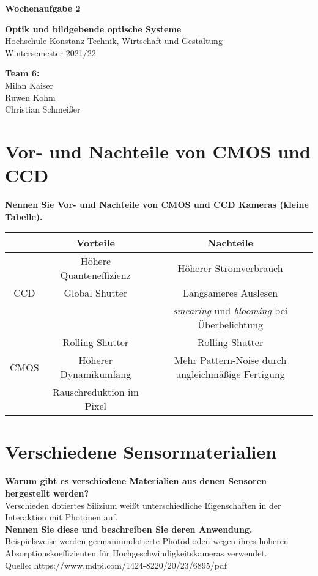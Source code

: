 \documentclass[a4paper]{article}
\begin{document}
	\thispagestyle{empty}
	
	\begin{center}\strut
		\bfseries\Huge
		Wochenaufgabe 2
	\end{center}
	\vfill
	
	\begin{center}\strut
		\textbf{Optik und bildgebende optische Systeme}\\
		Hochschule Konstanz Technik, Wirtschaft und Gestaltung\\
		Wintersemester 2021/22
	\end{center}
	
	\begin{center}\strut
		\textbf{Team 6:}\\
		Milan Kaiser\\
		Ruwen Kohm\\
		Christian Schmeißer\\
	\end{center}
	\vfill
	\vfill

	\clearpage
	
	\section{Vor- und Nachteile von CMOS und CCD}
	\textbf{Nennen Sie Vor- und Nachteile von CMOS und CCD Kameras (kleine Tabelle).}
	\begin{center}
		\begin{tabular}{ c|c|c }
			       & Vorteile & Nachteile \\ 
			       \hline
			       & Höhere Quanteneffizienz &  Höherer Stromverbrauch\\
			CCD	   & Global Shutter &  Langsameres Auslesen\\
				   & & \textit{smearing} und \textit{blooming} bei Überbelichtung\\
				   \hline  
			       & Rolling Shutter & Rolling Shutter \\ 
			CMOS   & Höherer Dynamikumfang & Mehr Pattern-Noise durch ungleichmäßige Fertigung \\
			       & Rauschreduktion im Pixel & \\
		\end{tabular}
	\end{center}
	
	\section{Verschiedene Sensormaterialien}
	\textbf{Warum gibt es verschiedene Materialien aus denen Sensoren hergestellt werden?}\\
	Verschieden dotiertes Silizium weißt unterschiedliche Eigenschaften in der Interaktion mit Photonen auf.\\
	\textbf{Nennen Sie diese und beschreiben Sie deren Anwendung.}\\
	Beispielsweise werden germaniumdotierte Photodioden wegen ihres höheren Absorptionskoeffizienten für Hochgeschwindigkeitskameras verwendet.\\
	Quelle: https://www.mdpi.com/1424-8220/20/23/6895/pdf
	
\end{document}
